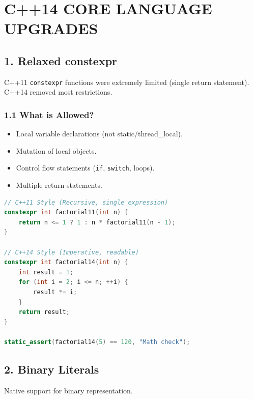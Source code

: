 \hypertarget{c14-core-language-upgrades}{%
\chapter{C++14 CORE LANGUAGE
UPGRADES}\label{c14-core-language-upgrades}}

\hypertarget{relaxed-constexpr}{%
\section{1. Relaxed constexpr}\label{relaxed-constexpr}}

C++11 \passthrough{\lstinline!constexpr!} functions were extremely
limited (single return statement). C++14 removed most restrictions.

\hypertarget{what-is-allowed}{%
\subsection{1.1 What is Allowed?}\label{what-is-allowed}}

\begin{itemize}
\tightlist
\item
  Local variable declarations (not static/thread\_local).
\item
  Mutation of local objects.
\item
  Control flow statements (\passthrough{\lstinline!if!},
  \passthrough{\lstinline!switch!}, loops).
\item
  Multiple return statements.
\end{itemize}

\begin{lstlisting}[language={C++}]
// C++11 Style (Recursive, single expression)
constexpr int factorial11(int n) {
    return n <= 1 ? 1 : n * factorial11(n - 1);
}

// C++14 Style (Imperative, readable)
constexpr int factorial14(int n) {
    int result = 1;
    for (int i = 2; i <= n; ++i) {
        result *= i;
    }
    return result;
}

static_assert(factorial14(5) == 120, "Math check");
\end{lstlisting}

\hypertarget{binary-literals}{%
\section{2. Binary Literals}\label{binary-literals}}

Native support for binary representation.

